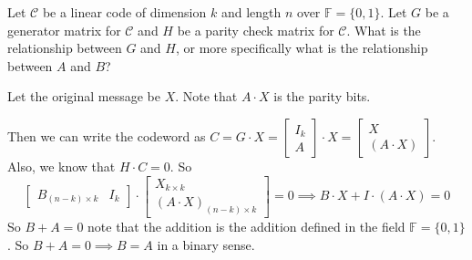 \documentclass[letterpaper,12pt]{article}
\begin{document}
Let $\mathcal{C}$ be a linear code of dimension $k$ and length $n$ over
$\mathbb{F}=\{0,1\}$. Let $G$ be a generator matrix for $\mathcal{C}$ and $H$
be a parity check matrix for $\mathcal{C}$. What is the relationship between
$G$ and $H$, or more specifically what is the relationship between $A$ and $B$?

Let the original message be $X$. Note that $A \cdot X$ is the parity bits.

Then we can write the codeword as $C = G \cdot X = \begin{bmatrix}
        I_k \\
        A
    \end{bmatrix} \cdot X = \begin{bmatrix}
        X \\
        (A \cdot X)
    \end{bmatrix}$. Also, we know that $H \cdot C = 0$. So \[
    \begin{bmatrix}
        B_{(n-k)\times k} & I_{k}
    \end{bmatrix} \cdot \begin{bmatrix}
        X_{k\times k} \\
        (A \cdot X)_{(n-k)\times k}
    \end{bmatrix} = 0 \implies B \cdot X + I \cdot (A \cdot X) = 0
\]
So $B+A=0$ note that the addition is the addition defined in the field
$\mathbb{F} = \{0,1\}$. So $B + A = 0 \implies B = A$ in a binary sense.
\end{document}
